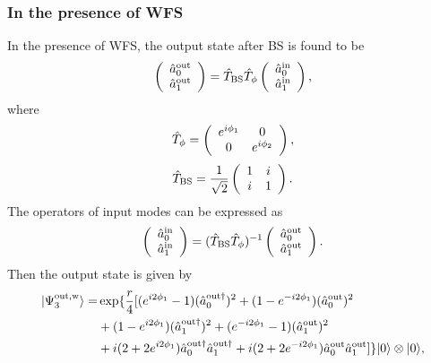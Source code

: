 \documentclass[9pt,twocolumn,twoside]{osajnl}
\begin{document}
\subsubsection{In the presence of WFS}
\label{bspresence}
In the presence of WFS, the output state after BS is found to be
\begin{align}
\left(
\begin{array}
[c]{c}%
\hat{a}_{0}^{\rm{out}} \\
\hat{a}_{1}^{\rm{out}}%
\end{array}
\right)
=
\hat{T}_{\rm{BS}} \hat{T}_{{\phi}}
\left(
\begin{array}
[c]{c}%
\hat{a}_{0}^{\rm{in}} \\
\hat{a}_{1}^{\rm{in}}%
\end{array}
\right)
,
\end{align}
where
\begin{align}
\hat{T}_{\phi}  =\left(
\begin{array}
[c]{cc}%
e^{i \phi_1} & 0\\
0 & e^{i \phi_2}%
\end{array}
\right)
,\label{bs2}
\end{align} 
\begin{align}
\hat{T}_{\rm{BS}}  =\frac{1}{\sqrt{2}}\left(
\begin{array}
[c]{cc}%
1 & i\\
i & 1%
\end{array}
\right)
.\label{bs}
\end{align}
The operators of input modes can be expressed as
\begin{align}
\left(
\begin{array}
[c]{c}%
\hat{a}_{0}^{\rm{in}} \\
\hat{a}_{1}^{\rm{in}}%
\end{array}
\right)
=
(\hat{T}_{\rm{BS}} \hat{T}_{{\phi}})^{-1}
\left(
\begin{array}
[c]{c}%
\hat{a}_{0}^{\rm{out}} \\
\hat{a}_{1}^{\rm{out}}%
\end{array}
\right)
.
\end{align}
Then the output state is given by
\begin{align}
|\Psi^{\rm{out,w}}_3 \rangle =& \exp\{\frac{r}{4}[(e^{i 2 \phi_1} - 1)(\hat{a}_{0}^{\rm{out} \dagger})^2 + (1 - e^{-i 2 \phi_1})(\hat{a}_{0}^{\rm{out}})^2  \\ \nonumber
&+ (1 - e^{i 2 \phi_1})(\hat{a}_{1}^{\rm{out} \dagger})^2 + (e^{-i 2 \phi_1} - 1)(\hat{a}_{1}^{\rm{out}})^2 \\ \nonumber &+ i(2 + 2 e^{i2\phi_1}) \hat{a}_{0}^{\rm{out} \dagger}\hat{a}_{1}^{\rm{out} \dagger}  + i(2 + 2 e^{-i2\phi_1}) \hat{a}_{0}^{\rm{out} }\hat{a}_{1}^{\rm{out}} ]\} |0\rangle \otimes |0\rangle,
\label{phieq}
\end{align}
\end{document}

